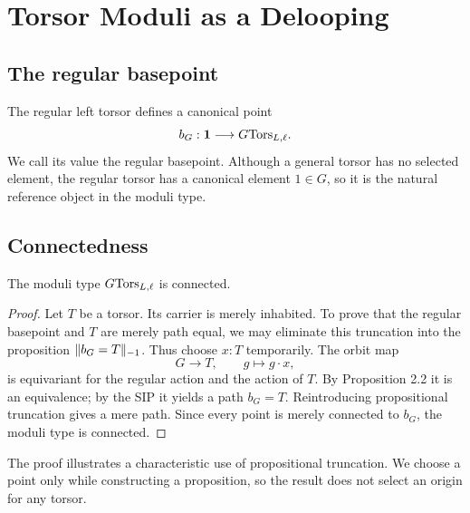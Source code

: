 \section{Torsor Moduli as a Delooping}
\label{ch:delooping}

\subsection{The regular basepoint}
The regular left torsor defines a canonical point
\begin{equation}
b_G:\mathbf{1}\longrightarrow G\mathrm{Tors}_{L,\ell}.
\end{equation}
We call its value the regular basepoint. Although a general torsor has no selected element, the regular torsor has a canonical element $1\in G$, so it is the natural reference object in the moduli type.


\subsection{Connectedness}
\begin{proposition}
The moduli type $G\mathrm{Tors}_{L,\ell}$ is connected.
\end{proposition}
\begin{proof}
Let $T$ be a torsor. Its carrier is merely inhabited. To prove that the regular basepoint and $T$ are merely path equal, we may eliminate this truncation into the proposition $\lVert b_G=T \rVert_{-1}$. Thus choose $x:T$ temporarily. The orbit map
\begin{equation}
G\longrightarrow T, \qquad g\longmapsto g\cdot x,
\end{equation}
is equivariant for the regular action and the action of $T$. By Proposition 2.2 it is an equivalence; by the SIP it yields a path $b_G=T$. Reintroducing propositional truncation gives a mere path. Since every point is merely connected to $b_G$, the moduli type is connected.
\end{proof}

The proof illustrates a characteristic use of propositional truncation. We choose a point only while constructing a proposition, so the result does not select an origin for any torsor.


